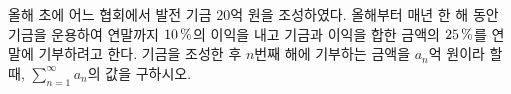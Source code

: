 올해 초에 어느 협회에서 발전 기금 $20$억 원을 조성하였다. 올해부터 매년 한 해 동안 기금을 운용하여 연말까지 $10\mkern3mu \%$의 이익을 내고 기금과 이익을 합한 금액의 $25\mkern3mu \%$를 연말에 기부하려고 한다. 기금을 조성한 후 $n$번째 해에 기부하는 금액을 $a_n$억 원이라 할 때, $\displaystyle\sum_{n=1}^{\infty} a_n$의 값을 구하시오.
